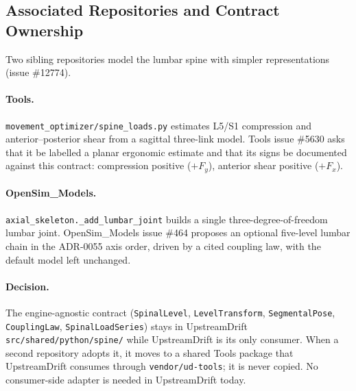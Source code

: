 \subsection{Associated Repositories and Contract Ownership}
\label{sec:spn-17}

Two sibling repositories model the lumbar spine with simpler representations
(issue \#12774).

\paragraph{Tools.} \texttt{movement\_optimizer/spine\_loads.py} estimates L5/S1
compression and anterior--posterior shear from a sagittal three-link model.
Tools issue \#5630 asks that it be labelled a planar ergonomic estimate and
that its signs be documented against this contract: compression positive
($+F_y$), anterior shear positive ($+F_x$).

\paragraph{OpenSim\_Models.} \texttt{axial\_skeleton.\_add\_lumbar\_joint} builds
a single three-degree-of-freedom lumbar joint. OpenSim\_Models issue \#464
proposes an optional five-level lumbar chain in the ADR-0055 axis order,
driven by a cited coupling law, with the default model left unchanged.

\paragraph{Decision.} The engine-agnostic contract (\texttt{SpinalLevel},
\texttt{LevelTransform}, \texttt{SegmentalPose}, \texttt{CouplingLaw},
\texttt{SpinalLoadSeries}) stays in UpstreamDrift
\texttt{src/shared/python/spine/} while UpstreamDrift is its only consumer.
When a second repository adopts it, it moves to a shared Tools package that
UpstreamDrift consumes through \texttt{vendor/ud-tools}; it is never copied.
No consumer-side adapter is needed in UpstreamDrift today.
